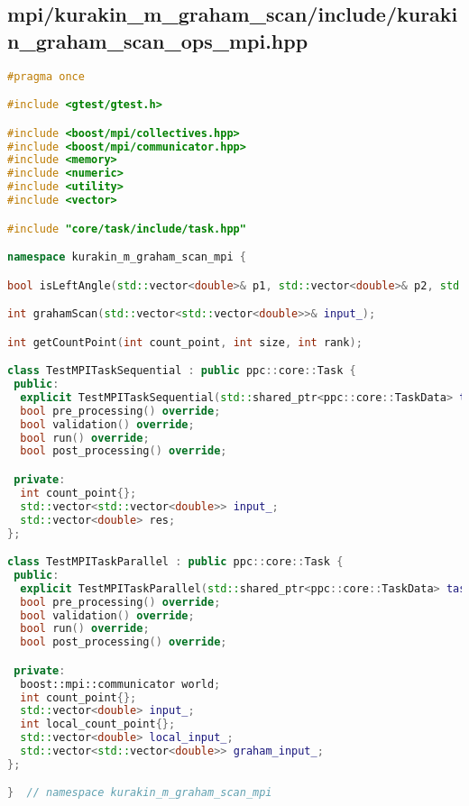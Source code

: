 \documentclass[12pt]{article}
\begin{document}
\subsection*{mpi/kurakin\_m\_graham\_scan/include/kurakin\_graham\_scan\_ops\_mpi.hpp}
\begin{lstlisting}[language=C++]
#pragma once

#include <gtest/gtest.h>

#include <boost/mpi/collectives.hpp>
#include <boost/mpi/communicator.hpp>
#include <memory>
#include <numeric>
#include <utility>
#include <vector>

#include "core/task/include/task.hpp"

namespace kurakin_m_graham_scan_mpi {

bool isLeftAngle(std::vector<double>& p1, std::vector<double>& p2, std::vector<double>& p3);

int grahamScan(std::vector<std::vector<double>>& input_);

int getCountPoint(int count_point, int size, int rank);

class TestMPITaskSequential : public ppc::core::Task {
 public:
  explicit TestMPITaskSequential(std::shared_ptr<ppc::core::TaskData> taskData_) : Task(std::move(taskData_)) {}
  bool pre_processing() override;
  bool validation() override;
  bool run() override;
  bool post_processing() override;

 private:
  int count_point{};
  std::vector<std::vector<double>> input_;
  std::vector<double> res;
};

class TestMPITaskParallel : public ppc::core::Task {
 public:
  explicit TestMPITaskParallel(std::shared_ptr<ppc::core::TaskData> taskData_) : Task(std::move(taskData_)) {}
  bool pre_processing() override;
  bool validation() override;
  bool run() override;
  bool post_processing() override;

 private:
  boost::mpi::communicator world;
  int count_point{};
  std::vector<double> input_;
  int local_count_point{};
  std::vector<double> local_input_;
  std::vector<std::vector<double>> graham_input_;
};

}  // namespace kurakin_m_graham_scan_mpi
\end{lstlisting}
\end{document}
